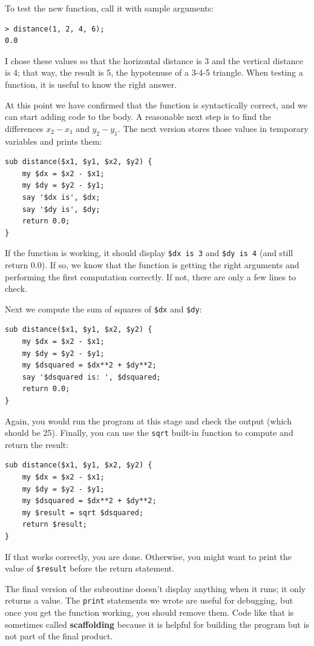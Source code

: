 To test the new function, call it with sample arguments:

\begin{verbatim}
> distance(1, 2, 4, 6);
0.0
\end{verbatim}
%
I chose these values so that the horizontal distance is 3 and the
vertical distance is 4; that way, the result is 5, the hypotenuse 
of a 3-4-5 triangle. When testing a function, it is
useful to know the right answer.

At this point we have confirmed that the function is syntactically
correct, and we can start adding code to the body.
A reasonable next step is to find the differences
$x_2 - x_1$ and $y_2 - y_1$.  The next version stores those values in
temporary variables and prints them:

\begin{verbatim}
sub distance($x1, $y1, $x2, $y2) {
    my $dx = $x2 - $x1;
    my $dy = $y2 - $y1;
    say '$dx is', $dx;
    say '$dy is', $dy;
    return 0.0;
}
\end{verbatim}
%
If the function is working, it should display \verb"$dx is 3" and 
\verb"$dy is 4" (and still return 0.0).  If so, we know that the 
function is getting the right arguments and performing the 
first computation correctly.  If not, there are only a few lines 
to check.

Next we compute the sum of squares of {\tt \$dx} and {\tt \$dy}:

\begin{verbatim}
sub distance($x1, $y1, $x2, $y2) {
    my $dx = $x2 - $x1;
    my $dy = $y2 - $y1;
    my $dsquared = $dx**2 + $dy**2;
    say '$dsquared is: ', $dsquared;
    return 0.0;
}
\end{verbatim}
%
Again, you would run the program at this stage and check the output
(which should be 25).
Finally, you can use the {\tt sqrt} built-in function to compute 
and return the result:

\begin{verbatim}
sub distance($x1, $y1, $x2, $y2) {
    my $dx = $x2 - $x1;
    my $dy = $y2 - $y1;
    my $dsquared = $dx**2 + $dy**2;
    my $result = sqrt $dsquared;
    return $result;
}
\end{verbatim}
%
If that works correctly, you are done.  Otherwise, you might
want to print the value of {\tt \$result} before the return
statement.

The final version of the subroutine doesn't display anything when it
runs; it only returns a value.  The {\tt print} statements we wrote
are useful for debugging, but once you get the function working, you
should remove them.  Code like that is sometimes called 
{\bf scaffolding} because it is helpful for building the program 
but is not part of the final product.

